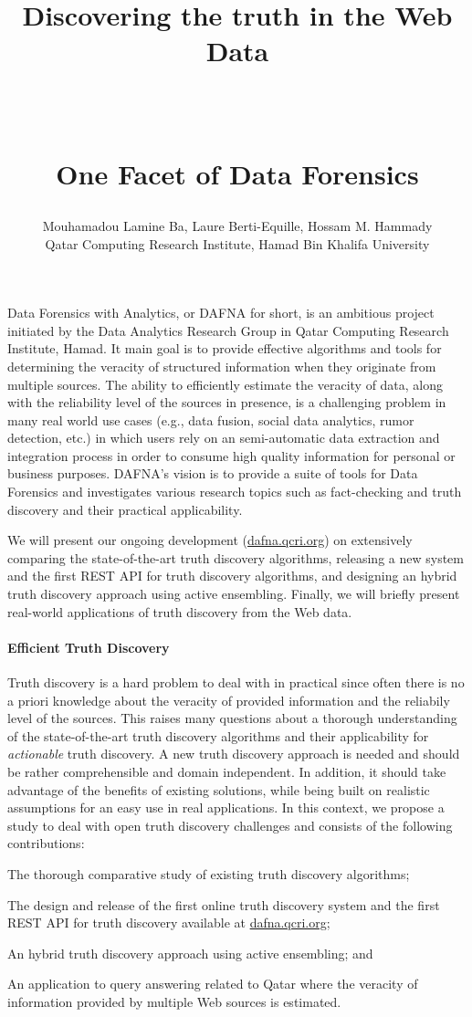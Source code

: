 \documentclass[paper=a4, fontsize=11pt]{scrartcl}	%
\title{ \vspace{-1in} 	\usefont{OT1}{bch}{b}{n}
		\huge \strut Discovering the truth in the Web Data\strut \\
		\Large \bfseries \strut One Facet of Data Forensics\strut
}
\author{ 									\usefont{OT1}{bch}{m}{n}
        Mouhamadou Lamine Ba, Laure Berti-Equille, Hossam M. Hammady\\		\usefont{OT1}{bch}{m}{n}
        Qatar Computing Research Institute, Hamad Bin Khalifa University\\	\usefont{OT1}{bch}{m}{n}
}
\date{}
\numberwithin{equation}{section}															%
\numberwithin{figure}{section}																%
\numberwithin{table}{section}																%
\begin{document}
\maketitle
 \vspace*{-1.5cm}
 Data Forensics with Analytics, or DAFNA for short, is an ambitious project initiated by the Data Analytics Research Group in Qatar Computing Research
 Institute, Hamad. It main goal is to provide effective algorithms and tools for determining the veracity of structured information when they originate
 from  multiple sources. The ability to efficiently estimate the veracity of data, along with the reliability level of the sources in presence, is a challenging
 problem in many real world use cases (e.g., data fusion, social data analytics, rumor detection, etc.) in which users rely on an semi-automatic data extraction
 and integration process in order to consume high quality information for personal or business purposes. DAFNA's vision is to provide a suite of tools for Data
 Forensics and investigates various research topics such as fact-checking and truth discovery and their practical applicability.

We will present our ongoing development (\url{dafna.qcri.org}) on extensively comparing the state-of-the-art truth discovery algorithms, releasing a new system and 
the first REST API for truth discovery algorithms, and designing an hybrid truth discovery approach using active ensembling. Finally, we will briefly present real-world
applications of truth discovery from the Web data.
 
 \paragraph*{Efficient Truth Discovery}Truth discovery is a hard problem to deal with in practical since often there is no a priori knowledge about the veracity of provided 
 information and the reliabily level of the sources. This raises many questions about a thorough understanding of the state-of-the-art truth discovery algorithms and their applicability
 for \emph{actionable} truth discovery. A new truth discovery approach is needed and should be rather comprehensible and domain independent. In addition, it should take advantage of the 
 benefits of existing solutions, while being built on realistic assumptions for an easy use in real applications. In this context, we propose a study to deal with open truth discovery challenges 
 and consists of the following contributions:
 \begin{inparaenum}[(i)]
  \item The thorough comparative study of existing truth discovery algorithms;
  \item The design and release of the first online truth discovery system and 
  the first REST API for truth discovery available at \url{dafna.qcri.org};
  \item An hybrid truth discovery approach using active ensembling; and 
  \item An application to query answering related to Qatar where the veracity of information provided by multiple Web sources is estimated.
 \end{inparaenum}
 \cite{*}
 
 
\end{document}
